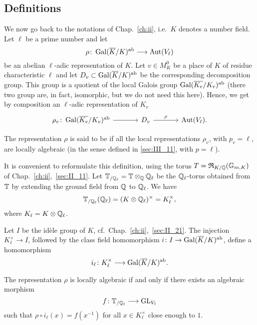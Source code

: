 \subsection{Definitions}
\label{sec:III_21}
We now go back to the notations of Chap.~\ref{ch:ii}, i.e.\ $K$ denotes a number
field. Let $\ell$ be a prime number and let 
\[
\rho \colon \operatorname{Gal}(\overline{K}/K)^{\mathrm{ab}} \longrightarrow \operatorname{Aut}(V_\ell)
\]
be an abelian $\ell$-adic representation
\dpage
of $K$.
Let $v \in M_K^0$ be a place of $K$ of residue characteristic $\ell$ and let
$D_v \subset \operatorname{Gal}(\overline{K}/K)^{\mathrm{ab}}$ be the corresponding decomposition group.
This group is a quotient of the local Galois group
$\operatorname{Gal}(\overline{K_v}/K_v)^{\mathrm{ab}}$ (there two group are, in fact, isomorphic, but we
do not need this here). Hence, we get by composition an $\ell$-adic
representation of $K_v$ 
\[\begin{tikzcd}[sep=large]
	\rho_v \colon \abcl{\Gal(\algcl{K_v}/K_v)} \rar & D_v \rar["\rho"] &
	\Aut(V_\ell).
\end{tikzcd}\]

\begin{mydef}
The representation $\rho$ is said to be  if all the
local representations $\rho_v$, with $p_v = \ell$, are locally algebraic (in the
sense defined in \ref{sec:III_11}, with $p = \ell$). 
\end{mydef}

It is convenient to reformulate this definition, using the torus $T =
\operatorname{\mathfrak{R}}_{K/\mathbb{Q}} (\mathbb{G}_{m, K})$ of Chap.~\ref{ch:ii},~\ref{sec:II_11}. Let
$\mathbb{T}_{/\mathbb{Q}_\ell} = \mathbb{T} \otimes_{\mathbb{Q}} \mathbb{Q}_\ell$ be the $\mathbb{Q}_\ell$-torus obtained
from $\mathbb{T}$ by extending the ground field from $\mathbb{Q}$ to $\mathbb{Q}_\ell$. We have
\[
\mathbb{T}_{/\mathbb{Q}_\ell}(\mathbb{Q}_\ell) = (K \otimes \mathbb{Q}_\ell)^{\times} = K_{\ell}^\times,
\]
where $K_\ell = K \otimes \mathbb{Q}_\ell$. 

Let $I$ be the idèle group of $K$, cf.\ Chap.~\ref{ch:ii},~\ref{sec:II_21}. The
injection $K_\ell^\times \to I$, followed by the class field homomorphism $i
\colon I \to \operatorname{Gal}(\overline{K}/K)^{\mathrm{ab}}$, define a homomorphism
\[
i_\ell \colon K_\ell^\times \longrightarrow \operatorname{Gal}(\overline{K}/K)^{\mathrm{ab}}.
\]

\begin{prop}
The representation $\rho$
\dpage
is locally algebraic if and only if there exists an algebraic morphism 
\[
f \colon \mathbb{T}_{/\mathbb{Q}_\ell} \longrightarrow \operatorname{GL}_{V_\ell}
\]
such that $\rho \circ i_\ell(x) = f(x^{-1})$ for all $x \in K_\ell^\times$
close enough to $1$. 
\end{prop}

